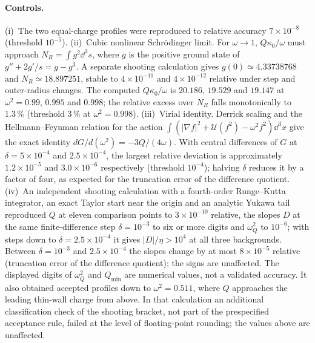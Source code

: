 \paragraph{Controls.}
(i)~The two equal-charge profiles were reproduced to relative accuracy
$7\times10^{-8}$ (threshold $10^{-5}$).
(ii)~Cubic nonlinear Schr\"odinger limit. For $\omega\to1$,
$Q\kappa_0/\omega$ must approach $N_R=\int g^2\dd^3s$, where $g$ is the
positive ground state of $g''+2g'/s=g-g^3$. A separate shooting
calculation gives $g(0)\simeq4.33738768$ and $N_R\simeq18.897251$, stable
to $4\times10^{-11}$ and $4\times10^{-12}$ relative under step and
outer-radius changes. The computed $Q\kappa_0/\omega$ is $20.186$,
$19.529$ and $19.147$ at $\omega^2=0.99$, $0.995$ and $0.998$; the
relative excess over $N_R$ falls monotonically to $1.3\,\%$ (threshold
$3\,\%$ at $\omega^2=0.998$).
(iii)~Virial identity. Derrick scaling and the Hellmann--Feynman
relation for the action $\int(|\nabla f|^2+\mathcal U(f^2)-\omega^2f^2)
\dd^3x$ give the exact identity $dG/d(\omega^2)=-3Q/(4\omega)$. With
central differences of $G$ at $\delta=5\times10^{-4}$ and
$2.5\times10^{-4}$, the largest relative deviation is approximately
$1.2\times10^{-5}$ and $3.0\times10^{-6}$ respectively (threshold
$10^{-4}$); halving $\delta$ reduces it by a factor of four, as expected
for the truncation error of the difference quotient.
(iv)~An independent shooting calculation with a fourth-order
Runge--Kutta integrator, an exact Taylor start near the origin and an
analytic Yukawa tail reproduced $Q$ at eleven comparison points to
$3\times10^{-10}$ relative, the slopes $D$ at the same finite-difference
step $\delta=10^{-3}$ to six or more digits and $\omega_Q^2$ to
$10^{-6}$; with steps down to $\delta=2.5\times10^{-4}$ it gives
$|D|/\eta>10^4$ at all three backgrounds. Between $\delta=10^{-3}$ and
$2.5\times10^{-4}$ the slopes change by at most $8\times10^{-5}$
relative (truncation error of the difference quotient); the signs are
unaffected. The displayed digits of $\omega_Q^2$ and $Q_{\min}$ are
numerical values, not a validated accuracy. It also obtained
accepted profiles down to $\omega^2=0.511$, where $Q$ approaches the
leading thin-wall charge from above. In that calculation an additional
classification check of the shooting bracket, not part of the
prespecified acceptance rule, failed at the level of floating-point
rounding; the values above are unaffected.

